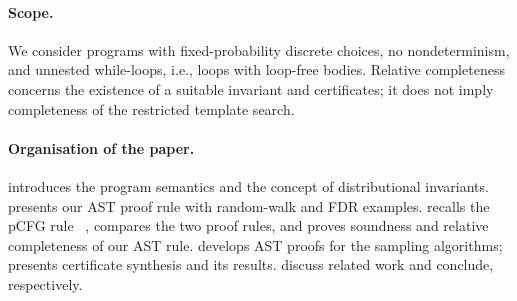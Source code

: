 \paragraph{Scope.}
We consider programs with fixed-probability discrete choices, no
nondeterminism, and unnested while-loops, i.e., loops with loop-free
bodies.
Relative completeness concerns the existence of a suitable invariant
and certificates; it does not imply completeness of the restricted
template search.

\paragraph{Organisation of the paper.}
 introduces the program semantics and the concept
of distributional invariants.
 presents our AST proof rule with random-walk and
FDR examples.
 recalls the pCFG rule%
~\cite{DBLP:journals/pacmpl/MajumdarS25}, compares the two proof rules,
and proves soundness and relative completeness of our AST rule.
 develops AST proofs for the sampling algorithms;
 presents certificate synthesis and
its results.
 discuss related work and conclude,
respectively.
